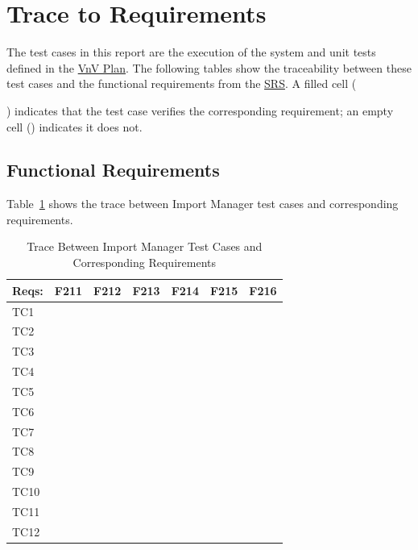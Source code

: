 \documentclass[12pt, titlepage]{article}
\begin{document}
\section{Trace to Requirements}\label{sec:trace-requirements}

\newcommand{\obox}{\fbox{\rule{0pt}{1.5ex}\hspace{1.5ex}}}
\newcommand{\xbox}{\colorbox{black}{\rule{0pt}{1.5ex}\hspace{1.5ex}}}

The test cases in this report are the execution of the system and unit tests defined in the \href{https://github.com/OmarHassanAdelhamid/Five-of-a-Kind-capstone-project-/blob/main/docs/VnVPlan/VnVPlan.pdf}{VnV Plan}. The following tables show the traceability between these test cases and the functional requirements from the \href{https://github.com/OmarHassanAdelhamid/Five-of-a-Kind-capstone-project-/blob/main/docs/SRS/SRS.pdf}{SRS}. A filled cell (\xbox) indicates that the test case verifies the corresponding requirement; an empty cell (\obox) indicates it does not.

\subsection{Functional Requirements}

Table~\ref{tab:report-imt} shows the trace between Import Manager test cases and corresponding requirements.

\begin{table}[H]
\centering
\caption{Trace Between Import Manager Test Cases and Corresponding Requirements}
\label{tab:report-imt}
\small
\setlength{\tabcolsep}{3pt}
\begin{tabular}{l|*{6}{c}}
\toprule
\textbf{Reqs:}
& F211 & F212 & F213 & F214 & F215 & F216\\
\midrule
TC1 & \xbox & \obox & \obox & \obox & \obox & \obox \\
TC2 & \xbox & \obox & \obox & \obox & \obox & \obox \\
TC3 & \xbox & \obox & \obox & \obox & \obox & \obox \\
TC4 & \xbox & \obox & \obox & \obox & \obox & \obox \\
TC5 & \obox & \xbox & \obox & \obox & \obox & \obox \\
TC6 & \obox & \obox & \xbox & \obox & \obox & \obox \\
TC7 & \obox & \obox & \obox & \xbox & \obox & \obox \\
TC8 & \obox & \obox & \obox & \obox & \obox & \xbox \\
TC9 & \obox & \obox & \obox & \obox & \obox & \xbox \\
TC10 & \obox & \obox & \obox & \obox & \obox & \xbox \\
TC11 & \obox & \obox & \xbox & \xbox & \xbox & \obox \\
TC12 & \obox & \obox & \xbox & \xbox & \xbox & \obox \\
\bottomrule
\end{tabular}
\end{table}
\end{document}
